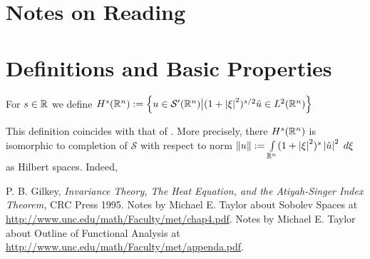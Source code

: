 \documentclass[10pt]{article} %
\begin{document}
\section{Notes on Reading \cite{gilkey}}
\section{Definitions and Basic Properties}
\begin{mydef}For $s\in\mathbb{R}$ we define $H^s(\mathbb{R}^n):=\left\{u\in\mathcal{S}'(\mathbb{R}^n)\big| (1+\left|\xi\right|^2)^{s/2}\hat{u}\in L^2(\mathbb{R}^n)\right\}$
	\end{mydef}
\begin{myremark}This definition coincides with that of \cite{gilkey}. More precisely, there $H^s(\mathbb{R}^n)$ is
isomorphic to completion of $\mathcal{S}$ with respect to norm $\mynorm{u}:=\int_{\R^n}(1+\myabs{\xi}^2)^{s}\myabs{\hat{u}}^2\;d\xi
$ as Hilbert spaces. Indeed, \end{myremark}%
\begin{thebibliography}{9}
	P. B. Gilkey, {\it Invariance Theory, The Heat Equation, and the Atiyah-Singer Index Theorem,} CRC Press 1995.
	Notes by Michael E. Taylor about Sobolev Spaces at \url{http://www.unc.edu/math/Faculty/met/chap4.pdf}.
	Notes by Michael E. Taylor about Outline of Functional Analysis
		at \url{http://www.unc.edu/math/Faculty/met/appenda.pdf}.
\end{thebibliography}
\end{document}
